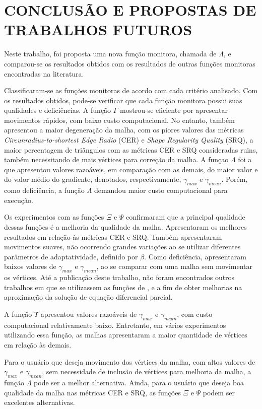 \section{CONCLUSÃO E PROPOSTAS DE TRABALHOS FUTUROS}
\label{cap:conclusao}

Neste trabalho, foi proposta uma nova função monitora, chamada de $\Lambda$, e comparou-se os resultados  obtidos com os resultados de outras funções monitoras encontradas na literatura. 

Classificaram-se as funções monitoras de acordo com cada critério analisado. Com os resultados obtidos, pode-se verificar que cada função monitora possui suas qualidades e deficiências. A função $\Gamma$ mostrou-se eficiente por apresentar movimentos rápidos, com baixo custo computacional. No entanto, também apresentou a maior degeneração da malha, com os piores valores das métricas  {\it Circunradius-to-shortest Edge Radio} (CER) e {\it Shape Regularity Quality} (SRQ), a maior percentagem de triângulos com as métricas CER e SRQ consideradas ruins, também necessitando de mais vértices para correção da malha. A funçao $\Lambda$ foi a que apresentou valores razoáveis, em comparação com as demais, do maior valor e do valor médio do gradiente, denotados, respectivamente, $\gamma_{max}$ e $\gamma_{mean}$. Porém, como deficiência, a função $\Lambda$ demandou maior custo computacional para execução.

Os experimentos com as funções $\Xi$ e $\Psi$ confirmaram que a principal qualidade dessas funções é a melhoria da qualidade da malha. Apresentaram os melhores resultados em relação às métricas CER e SRQ. Também apresentaram movimentos suaves, não ocorrendo grandes variações ao se utilizar diferentes parâmetros de adaptatividade, definido por $\beta$. Como deficiência, apresentaram baixos valores de $\gamma_{max}$ e $\gamma_{mean}$, ao se comparar com uma malha sem movimentar os vértices. Até a publicação deste trabalho, não foram encontrados outros trabalhos em que se utilizassem as funções de ,  e  a fim de obter melhorias na aproximação da solução de equação diferencial parcial.

A função $\Upsilon$ apresentou valores razoáveis de $\gamma_{max}$ e $\gamma_{mean}$, com custo computacional relativamente baixo. Entretanto, em vários experimentos utilizando essa função, as malhas apresentaram a maior quantidade de vértices em relação às demais. 

Para o usuário que deseja movimento dos vértices da malha, com altos valores de $\gamma_{max}$ e $\gamma_{mean}$, sem necessidade de inclusão de vértices para melhoria da malha, a função $\Lambda$ pode ser a melhor alternativa. Ainda, para o usuário que deseja boa qualidade da malha nas métricas CER e SRQ, as funções $\Xi$  e $\Psi$ podem ser excelentes alternativas.

